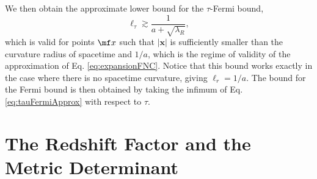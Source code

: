 We then obtain the approximate lower bound for the $\tau$-Fermi bound,
\begin{equation}\label{eq:tauFermiApprox}
    \ell_\tau \gtrsim \frac{1}{a+\sqrt{\lambda_R}},
\end{equation}
which is valid for points $\mf x$ such that $|\bm x|$ is sufficiently smaller than the curvature radius of spacetime and $1/a$, which is the regime of validity of the approximation of Eq. \eqref{eq:expansionFNC}. Notice that this bound works exactly in the case where there is no spacetime curvature, giving \mbox{$\ell_r = 1/a$}. The bound for the Fermi bound is then obtained by taking the infimum of Eq. \eqref{eq:tauFermiApprox} with respect to $\tau$.





\chapter{The Redshift Factor and the Metric Determinant}\label{app:det}


